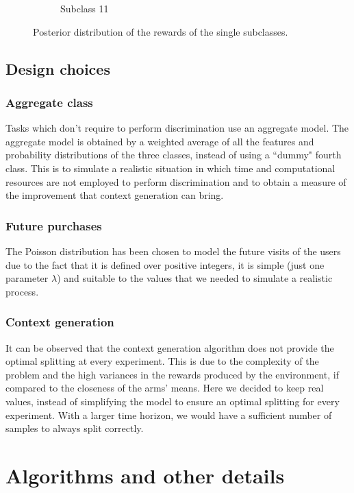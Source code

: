 \documentclass[12pt,a4paper]{report}
\begin{document}
\begin{figure}[H]
\begin{subfigure}{.49\textwidth}
  \caption{Subclass 11}
  \label{fig:sub4}
\end{subfigure}
	\caption{Posterior distribution of the rewards of the single subclasses.}
\end{figure}
		\section{Design choices}
			\subsection{Aggregate class}
Tasks which don't require to perform discrimination use an aggregate model. The aggregate model is obtained by a weighted average of all the features and probability distributions of the three classes, instead of using a ``dummy" fourth class. This is to simulate a realistic situation in which time and computational resources are not employed to perform discrimination and to obtain a measure of the improvement that context generation can bring.
			\subsection{Future purchases}
The Poisson distribution has been chosen to model the future visits of the users due to the fact that it is defined over positive integers, it is simple (just one parameter $\lambda$) and suitable to the values that we needed to simulate a realistic process.
			\subsection{Context generation}
It can be observed that the context generation algorithm does not provide the optimal splitting at every experiment. This is due to the complexity of the problem and the high variances in the rewards produced by the environment, if compared to the closeness of the arms' means. Here we decided to keep real values, instead of simplifying the model to ensure an optimal splitting for every experiment. With a larger time horizon, we would have a sufficient number of samples to always split correctly.


	\chapter{Algorithms and other details}
\end{document}

